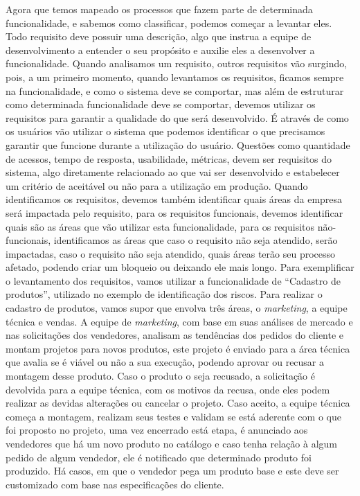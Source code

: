       Agora que temos mapeado os processos que fazem parte de determinada funcionalidade,
      e sabemos como classificar, podemos começar a levantar eles. Todo requisito
      deve possuir uma descrição, algo que instrua a equipe de desenvolvimento a entender
      o seu propósito e auxilie eles a desenvolver a funcionalidade. Quando analisamos
      um requisito, outros requisitos vão surgindo, pois, a um primeiro momento,
      quando levantamos os requisitos, ficamos sempre na funcionalidade, e como o
      sistema deve se comportar, mas além de estruturar como determinada funcionalidade
      deve se comportar, devemos utilizar os requisitos para garantir a
      qualidade do que será desenvolvido. É através de como os usuários vão utilizar
      o sistema que podemos identificar o que precisamos garantir que funcione durante
      a utilização do usuário. Questões como quantidade de acessos, tempo de resposta,
      usabilidade, métricas, devem ser requisitos do sistema, algo
      diretamente relacionado ao que vai ser desenvolvido e estabelecer um critério de
      aceitável ou não para a utilização em produção. Quando identificamos os requisitos,
      devemos também identificar quais áreas da empresa será impactada pelo requisito,
      para os requisitos funcionais, devemos identificar quais são as áreas que vão
      utilizar esta funcionalidade, para os requisitos não-funcionais, identificamos
      as áreas que caso o requisito não seja atendido, serão impactadas, caso o
      requisito não seja atendido, quais áreas terão seu processo afetado, podendo
      criar um bloqueio ou deixando ele mais longo. Para exemplificar o levantamento
      dos requisitos, vamos utilizar a funcionalidade de “Cadastro de produtos”,
      utilizado no exemplo de identificação dos riscos. \newline
      Para realizar o cadastro de produtos, vamos supor que envolva três áreas, o
      \textit{marketing}, a equipe técnica e vendas. A equipe de \textit{marketing},
      com base em suas análises de mercado e nas solicitações dos vendedores, analisam
      as tendências dos pedidos do cliente e montam projetos para novos produtos,
      este projeto é enviado para a área técnica que avalia se é viável ou não a
      sua execução, podendo aprovar ou recusar a montagem desse produto. Caso o
      produto o seja recusado, a solicitação é devolvida para a equipe técnica,
      com os motivos da recusa, onde eles podem realizar as devidas alterações ou
      cancelar o projeto. Caso aceito, a equipe técnica começa a montagem,
      realizam seus testes e validam se está aderente com o que foi proposto no
      projeto, uma vez encerrado está etapa, é anunciado aos vendedores que há um
      novo produto no catálogo e caso tenha relação à algum pedido de algum vendedor,
      ele é notificado que determinado produto foi produzido. Há casos, em que o
      vendedor pega um produto base e este deve ser customizado com base nas
      especificações do cliente. \newline

